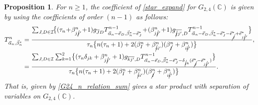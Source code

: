 \documentclass[pdftex]{sigma}
\numberwithin{equation}{section}
\newtheorem{Proposition}[Theorem]{Proposition}
 { \theoremstyle{definition}
\newtheorem{Definition}[Theorem]{Definition}
\newtheorem{Note}[Theorem]{Note}
\newtheorem{Example}[Theorem]{Example}
\newtheorem{Remark}[Theorem]{Remark} }
\begin{document}
\begin{Proposition}\label{Cor_G24_relation_sum}
For $n\geq1$, the coefficient  of \eqref{star_expand}
for $G_{2,4}(\mathbb{C})$ is given by using the coefficients of order $(n-1)$ as follows:
\begin{align}
 T^{n}_{\vec{\alpha}_{n},\vec{\beta}_{n}^{\ast}}
 ={}&
 \frac{
 \sum_{
 J,D
 \in
 \mathcal{I}
 }\!
 \bigl\{
 (
 \tau_{n}\!
 +\!
 \beta_{j\cancel{j}'}^{n}\!
 +\!
 1
 )
 g_{\overline{J}D}
 T^{n-1}_{
 \vec{\alpha}_{n}
 -
 \vec{e}_{D},
 \vec{\beta}_{n}^{\ast}
 -
 \vec{e}_{J}^{\ast}
 }\!
 +\!
 (
 \beta_{j\cancel{j}'}^{n}\!
 +\!
 1
 )
 g_{\overline{\cancel{j}j'},D}
 T^{n-1}_{
 \vec{\alpha}_{n}
 -
 \vec{e}_{D},
 \vec{\beta}_{n}^{\ast}
 -
 \vec{e}_{J}^{\ast}
 -
 \vec{e}_{\cancel{J}}^{\ast}
 +
 \vec{e}_{j\cancel{j}'}^{\ast}
 }
 \bigr\}
 }{
 \tau_{n}
 \bigl\{
 n
 (
 \tau_{n}+1
 )
 +
 2
 (
 \beta_{I}^{n}
 +
 \beta_{\cancel{i}i'}^{n}
 )
 (
 \beta_{\cancel{I}}^{n}
 +
 \beta_{i\cancel{i}'}^{n}
 )
 \bigr\}
 },
 \nonumber
 \\
 ={}&
 \frac{
 \sum_{
 J,D
 \in
 \mathcal{I}
 }
 \sum_{k=1}^{2}
 \bigl\{
 (
 \tau_{n}
 \delta_{jk}
 +
 \beta_{j\cancel{j}'}^{n}
 +
 1
 )
 g_{\overline{kj'},D}
 T^{n-1}_{
 \vec{\alpha}_{n}
 -
 \vec{e}_{D},
 \vec{\beta}_{n}^{\ast}
 -
 \vec{e}_{J}^{\ast}
 -
 \delta_{\cancel{j}k}
 (
 \vec{e}_{\cancel{J}}^{\ast}
 -
 \vec{e}_{j\cancel{j}'}^{\ast}
 )
 }
 \bigr\}
 }{
 \tau_{n}
 \bigl\{
 n
 (
 \tau_{n}+1
 )
 +
 2
 (
 \beta_{I}^{n}
 +
 \beta_{\cancel{i}i'}^{n}
 )
 (
 \beta_{\cancel{I}}^{n}
 +
 \beta_{i\cancel{i}'}^{n}
 )
 \bigr\}
 }.
\label{G24_n_relation_sum}
\end{align}
That is,  given by \eqref{G24_n_relation_sum} gives a star product with separation of variables on $G_{2,4}(\mathbb{C})$.
\end{Proposition}
\end{document}
